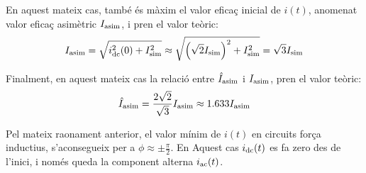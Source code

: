 En aquest mateix cas, també és màxim el valor eficaç inicial de $i(t)$, anomenat valor eficaç asimètric $I_\mathrm{asim}$,  i pren el valor teòric:
\begin{equation}
    I_\mathrm{asim} = \sqrt{i_\mathrm{dc}^2(0) + I_\mathrm{sim}^2} \approx \sqrt{\left(\sqrt{2}I_\mathrm{sim}\right)^2 + I_\mathrm{sim}^2} = \sqrt{3} I_\mathrm{sim} \label{eq:I_asim_eff}
\end{equation}

Finalment, en aquest mateix cas la relació entre $\hat{I}_\mathrm{asim}$ i $I_\mathrm{asim}$,   pren el valor teòric:
\begin{equation}
    \hat{I}_\mathrm{asim} = \frac{2\sqrt{2}}{\sqrt{3}} I_\mathrm{asim} \approx
    \num{1,633} I_\mathrm{asim}
\end{equation}

Pel mateix raonament anterior, el valor mínim de $i(t)$ en circuits força inductius, s'aconsegueix per a $\phi \approx \pm\frac{\pi}{2}$. En Aquest cas $i_\mathrm{dc}(t)$ es fa zero des de l'inici, i només queda la component alterna $i_\mathrm{ac}(t)$.


